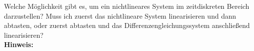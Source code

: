 \begin{question}[section=6,name={Nichtlineares System im zeitdiskreten},difficulty=,type=mdl,tags={}]
	Welche Möglichkeit gibt es, um ein nichtlineares System im zeitdiskreten Bereich darzustellen? Muss ich zuerst das nichtlineare System linearisieren und dann abtasten, oder zuerst abtasten und das Differenzengleichungssystem anschließend linearisieren?
	\\ \textbf{Hinweis:}\\
	
\end{question}
\begin{solution}
	
\end{solution}